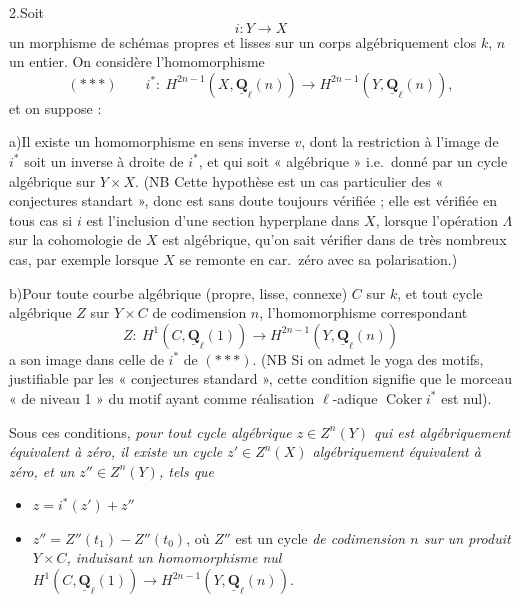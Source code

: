 \documentclass[11pt,a4paper]{article}
\begin{document}
2.\quad Soit
\[ i\colon Y \longrightarrow X \]
un morphisme de schémas propres et lisses sur un corps algébriquement clos $k$, $n$
un entier. On
 considère l'homomorphisme
\[ (***) \qquad i^{*}\colon\ H^{2n-1}(X, \underline{\mathbf{Q}}_\ell(n))
\longrightarrow H^{2n-1}(Y, \underline{\mathbf{Q}}_\ell(n)) , \]
et on suppose :

a)\quad Il existe un homomorphisme en sens inverse $v$, dont la restriction à
l'image de $i^{*}$ soit un inverse à droite de $i^{*}$, et qui soit « algébrique »
i.e.\ donné par un cycle algébrique sur $Y \times X$. (NB Cette hypothèse est un
cas particulier des « conjectures standart », donc est sans doute toujours
vérifiée ; elle est vérifiée en tous cas si $i$ est l'inclusion d'une section
hyperplane dans $X$, lorsque l'opération $\Lambda$ sur la cohomologie de $X$ est
algébrique,  qu'on sait vérifier dans de très nombreux cas, par
exemple lorsque $X$ se remonte en car.\ zéro avec sa polarisation.)



b)\quad Pour toute courbe algébrique (propre, lisse, connexe) $C$ sur $k$, et tout
cycle algébrique $Z$ sur $Y \times C$ de codimension $n$, l'homomorphisme
correspondant
\[ Z\colon\ H^1(C, \underline{\mathbf{Q}}_\ell(1)) \longrightarrow H^{2n-1}(Y,
\underline{\mathbf{Q}}_\ell(n)) \]
a son image dans celle de $i^{*}$ de $(***)$. (NB Si on admet le yoga des motifs,
justifiable par les « conjectures standard », cette condition signifie que le
 morceau « de niveau 1 » du motif ayant comme réalisation
$\ell$-adique $\operatorname{Coker} i^{*}$ est nul).

Sous ces conditions, \emph{pour tout cycle algébrique $z \in Z^n(Y)$ qui est
algébriquement équivalent à zéro, il existe un cycle $z' \in Z^n(X)$
algébriquement équivalent à zéro, et un $z'' \in Z^n(Y)$, tels que}
\begin{itemize}
\item[a')] $z = i^{*}(z') + z''$
\item[b')] $z'' = Z''(t_1) - Z''(t_0)$, où $Z''$ est un cycle
\emph{de codimension $n$ sur un produit $Y \times C$, induisant un homomorphisme
nul} $H^1(C, \underline{\mathbf{Q}}_\ell(1)) \to H^{2n-1}(Y,
\underline{\mathbf{Q}}_\ell(n))$.
\end{itemize}
\end{document}
